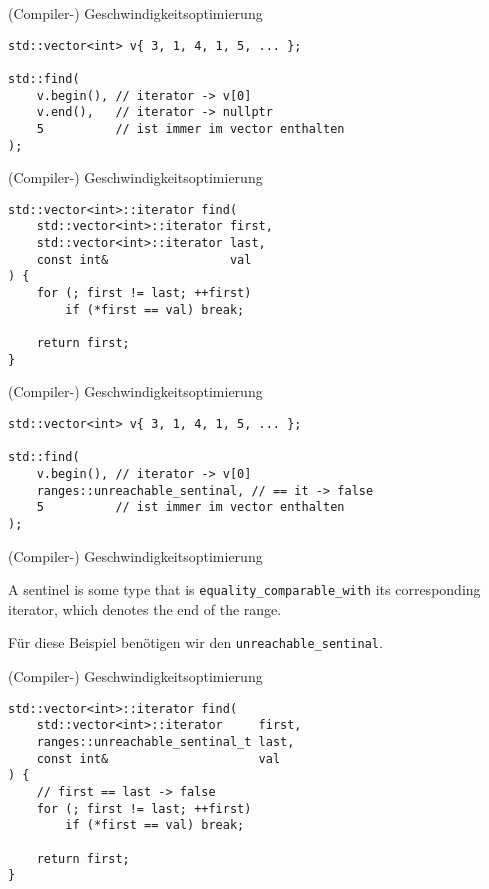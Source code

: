 \begin{frame}[fragile]{(Compiler-) Geschwindigkeitsoptimierung}
    \begin{verbatim}
std::vector<int> v{ 3, 1, 4, 1, 5, ... };

std::find(
    v.begin(), // iterator -> v[0]
    v.end(),   // iterator -> nullptr
    5          // ist immer im vector enthalten
);
    \end{verbatim}
\end{frame}

\begin{frame}[fragile]{(Compiler-) Geschwindigkeitsoptimierung}
    \begin{verbatim}
std::vector<int>::iterator find(
    std::vector<int>::iterator first,
    std::vector<int>::iterator last,
    const int&                 val
) {
    for (; first != last; ++first)
        if (*first == val) break;
    
    return first;
}
    \end{verbatim}
\end{frame}

\begin{frame}[fragile]{(Compiler-) Geschwindigkeitsoptimierung}
    \begin{verbatim}
std::vector<int> v{ 3, 1, 4, 1, 5, ... };

std::find(
    v.begin(), // iterator -> v[0]
    ranges::unreachable_sentinal, // == it -> false
    5          // ist immer im vector enthalten
);
    \end{verbatim}
\end{frame}

\begin{frame}{(Compiler-) Geschwindigkeitsoptimierung}
    \begin{center}
        A sentinel is some type that is \texttt{equality\_comparable\_with} its corresponding iterator, which denotes the end of the range.

        \vspace{2.5em}

        Für diese Beispiel benötigen wir den \texttt{unreachable\_sentinal}.
    \end{center}
\end{frame}

\begin{frame}[fragile]{(Compiler-) Geschwindigkeitsoptimierung}
    \begin{verbatim}
std::vector<int>::iterator find(
    std::vector<int>::iterator     first,
    ranges::unreachable_sentinal_t last,
    const int&                     val
) {
    // first == last -> false
    for (; first != last; ++first)
        if (*first == val) break;
    
    return first;
}
    \end{verbatim}
\end{frame}

